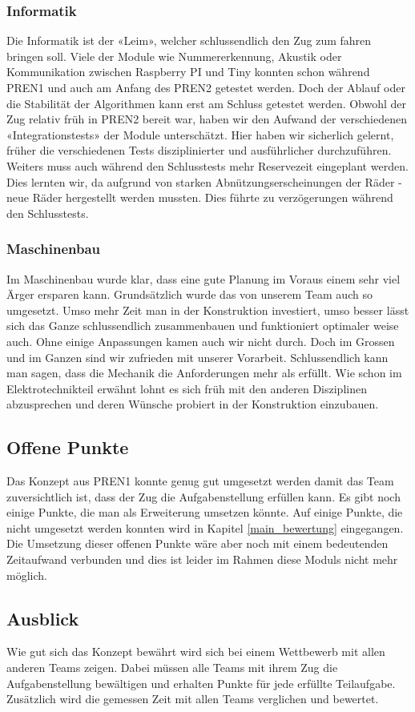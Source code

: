 \documentclass[../../main.tex]{subfiles}
\begin{document}
\subsubsection{Informatik}
Die Informatik ist der «Leim», welcher schlussendlich den Zug zum fahren bringen soll. Viele der Module wie Nummererkennung, Akustik oder Kommunikation zwischen Raspberry PI und Tiny konnten schon während PREN1 und auch am Anfang des PREN2 getestet werden. Doch der Ablauf oder die Stabilität der Algorithmen kann erst am Schluss getestet werden. Obwohl der Zug relativ früh in PREN2 bereit war, haben wir den Aufwand der verschiedenen «Integrationstests» der Module unterschätzt. Hier haben wir sicherlich gelernt, früher die verschiedenen Tests disziplinierter und ausführlicher durchzuführen.\\
Weiters muss auch während den Schlusstests mehr Reservezeit eingeplant werden. Dies lernten wir, da aufgrund von starken Abnützungserscheinungen der Räder - neue Räder hergestellt werden mussten. Dies führte zu verzögerungen während den Schlusstests.

\pagebreak

\subsubsection{Maschinenbau}
Im Maschinenbau wurde klar, dass eine gute Planung im Voraus einem sehr viel Ärger ersparen kann. Grundsätzlich wurde das von unserem Team auch so umgesetzt. Umso mehr Zeit man in der Konstruktion investiert, umso besser lässt sich das Ganze schlussendlich zusammenbauen und funktioniert optimaler weise auch. Ohne einige Anpassungen kamen auch wir nicht durch. Doch im Grossen und im Ganzen sind wir zufrieden mit unserer Vorarbeit. Schlussendlich kann man sagen, dass die Mechanik die Anforderungen mehr als erfüllt.
Wie schon im Elektrotechnikteil erwähnt lohnt es sich früh mit den anderen Disziplinen abzusprechen und deren Wünsche probiert in der Konstruktion einzubauen.



\subsection{Offene Punkte}
Das Konzept aus PREN1 konnte genug gut umgesetzt werden damit das Team zuversichtlich ist, dass der Zug die Aufgabenstellung erfüllen kann. Es gibt noch einige Punkte, die man als Erweiterung umsetzen könnte. Auf einige Punkte, die nicht umgesetzt werden konnten wird in Kapitel \ref{main_bewertung} eingegangen. Die Umsetzung dieser offenen Punkte wäre aber noch mit einem bedeutenden Zeitaufwand verbunden und dies ist leider im Rahmen diese Moduls nicht mehr möglich.

\subsection{Ausblick}
Wie gut sich das Konzept bewährt wird sich bei einem Wettbewerb mit allen anderen Teams zeigen. Dabei müssen alle Teams mit ihrem Zug die Aufgabenstellung bewältigen und erhalten Punkte für jede erfüllte Teilaufgabe. Zusätzlich wird die gemessen Zeit mit allen Teams verglichen und bewertet.
\end{document}
